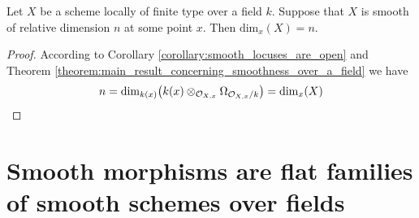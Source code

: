 \begin{corollary}\label{corollary:relative_smooth_dimension_is_local_dimension}
Let $X$ be a scheme locally of finite type over a field $k$. Suppose that $X$ is smooth of relative dimension $n$ at some point $x$. Then $\mathrm{dim}_x(X)=n$.
\end{corollary}
\begin{proof}
According to Corollary \ref{corollary:smooth_locuses_are_open} and Theorem \ref{theorem:main_result_concerning_smoothness_over_a_field} we have
$$n = \mathrm{dim}_{k(x)}\big(k(x)\otimes_{{\mathcal O}_{X,x}}\Omega_{{\mathcal O}_{X,x}/k}\big) = \mathrm{dim}_x(X)$$
\end{proof}

\section{Smooth morphisms are flat families of smooth schemes over fields}

